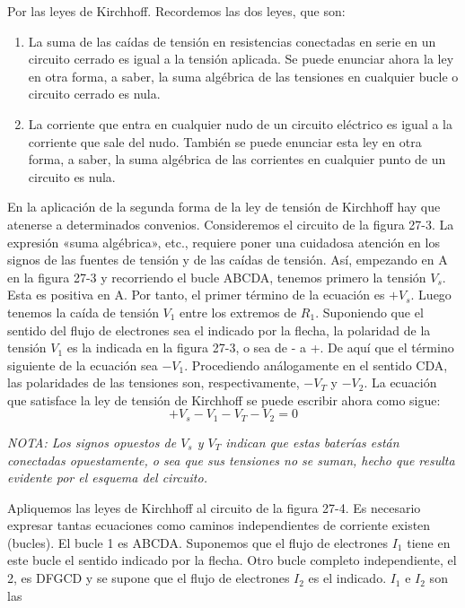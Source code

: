 
Por las leyes de Kirchhoff. Recordemos las dos leyes, que son:

\begin{enumerate}
    \item La suma de las caídas de tensión en resistencias conectadas en serie en un circuito cerrado es igual a la tensión aplicada. Se puede enunciar ahora la ley en otra forma, a saber, la suma algébrica de las tensiones en cualquier bucle o circuito cerrado es nula.
    
    \item La corriente que entra en cualquier nudo de un circuito eléctrico es igual a la corriente que sale del nudo. También se puede enunciar esta ley en otra forma, a saber, la suma algébrica de las corrientes en cualquier punto de un circuito es nula.
\end{enumerate}

En la aplicación de la segunda forma de la ley de tensión de Kirchhoff hay que atenerse a determinados convenios. Consideremos el circuito de la figura 27-3. La expresión «suma algébrica», etc., requiere poner una cuidadosa atención en los signos de las fuentes de tensión y de las caídas de tensión. Así, empezando en A en la figura 27-3 y recorriendo el bucle ABCDA, tenemos primero la tensión \( V_s \). Esta es positiva en A. Por tanto, el primer término de la ecuación es \(+ V_s\). Luego tenemos la caída de tensión \( V_1 \) entre los extremos de \( R_1 \). Suponiendo que el sentido del flujo de electrones sea el indicado por la flecha, la polaridad de la tensión \( V_1 \) es la indicada en la figura 27-3, o sea de - a +. De aquí que el término siguiente de la ecuación sea \(- V_1\). Procediendo análogamente en el sentido CDA, las polaridades de las tensiones son, respectivamente, \(- V_T\) y \(- V_2\). La ecuación que satisface la ley de tensión de Kirchhoff se puede escribir ahora como sigue:
\[
+ V_s - V_1 - V_T - V_2 = 0 \tag{27-5}
\]

\begin{center}
\textit{NOTA: Los signos opuestos de \( V_s \) y \( V_T \) indican que estas baterías están conectadas opuestamente, o sea que sus tensiones no se suman, hecho que resulta evidente por el esquema del circuito.}
\end{center}

Apliquemos las leyes de Kirchhoff al circuito de la figura 27-4. Es necesario expresar tantas ecuaciones como caminos independientes de corriente existen (bucles). El bucle 1 es ABCDA. Suponemos que el flujo de electrones \( I_1 \) tiene en este bucle el sentido indicado por la flecha. Otro bucle completo independiente, el 2, es DFGCD y se supone que el flujo de electrones \( I_2 \) es el indicado. \( I_1 \) e \( I_2 \) son las

